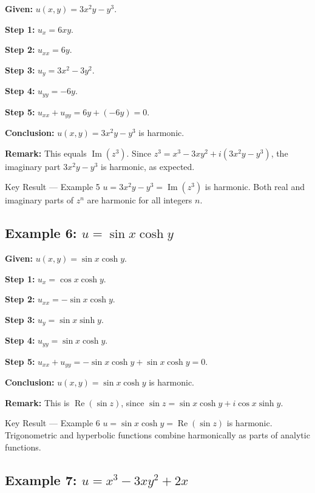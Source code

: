 \documentclass[12pt,a4paper]{article}
\begin{document}
\textbf{Given:} $u(x,y)=3x^{2}y-y^{3}$.

\textbf{Step 1:} $u_{x} = 6xy$.

\textbf{Step 2:} $u_{xx} = 6y$.

\textbf{Step 3:} $u_{y} = 3x^{2}-3y^{2}$.

\textbf{Step 4:} $u_{yy} = -6y$.

\textbf{Step 5:} $u_{xx}+u_{yy} = 6y+(-6y) = 0$.

\textbf{Conclusion:} $u(x,y)=3x^{2}y-y^{3}$ is harmonic.

\textbf{Remark:} This equals $\operatorname{Im}(z^{3})$. Since $z^{3}=x^{3}-3xy^{2}
+i(3x^{2}y-y^{3})$, the imaginary part $3x^{2}y-y^{3}$ is harmonic, as expected.

\begin{learnbox}{Key Result --- Example 5}
$u=3x^{2}y-y^{3}=\operatorname{Im}(z^{3})$ is harmonic. Both real and imaginary parts of
$z^{n}$ are harmonic for all integers $n$.
\end{learnbox}

\subsection*{Example 6: $u = \sin x \cosh y$}

\textbf{Given:} $u(x,y)=\sin x \cosh y$.

\textbf{Step 1:} $u_{x} = \cos x \cosh y$.

\textbf{Step 2:} $u_{xx} = -\sin x \cosh y$.

\textbf{Step 3:} $u_{y} = \sin x \sinh y$.

\textbf{Step 4:} $u_{yy} = \sin x \cosh y$.

\textbf{Step 5:} $u_{xx}+u_{yy} = -\sin x \cosh y + \sin x \cosh y = 0$.

\textbf{Conclusion:} $u(x,y)=\sin x \cosh y$ is harmonic.

\textbf{Remark:} This is $\operatorname{Re}(\sin z)$, since $\sin z = \sin x \cosh y
+ i\cos x \sinh y$.

\begin{learnbox}{Key Result --- Example 6}
$u=\sin x \cosh y = \operatorname{Re}(\sin z)$ is harmonic. Trigonometric and hyperbolic
functions combine harmonically as parts of analytic functions.
\end{learnbox}

\subsection*{Example 7: $u = x^{3}-3xy^{2}+2x$}
\end{document}
